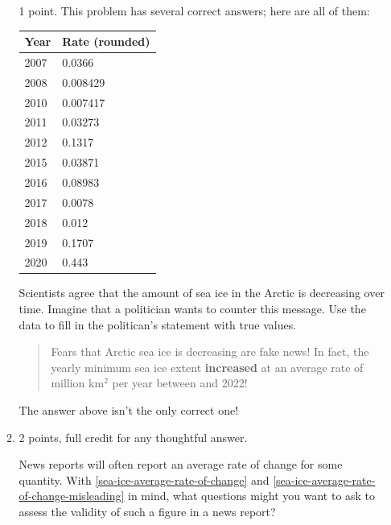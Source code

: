 \documentclass{article}
\begin{document}
\begin{enumerate}
\begin{enumerate}
    \begin{grading}
      1 point. This problem has several correct answers; here are all of them: 

      \begin{tabular}{l | l}
        Year & Rate (rounded) \\
        \hline 
        2007 & 0.0366 \\
        2008 & 0.008429 \\
        2010 & 0.007417 \\
        2011 & 0.03273 \\
        2012 & 0.1317 \\
        2015 & 0.03871 \\
        2016 & 0.08983 \\
        2017 & 0.0078 \\
        2018 & 0.012 \\
        2019 & 0.1707 \\
        2020 & 0.443
      \end{tabular}
    \end{grading}

    \begin{problem}[\vfill]
      Scientists agree that the amount of sea ice in the Arctic is decreasing over time. Imagine that a politician wants to counter this message. Use the data to fill in the politican's statement with true values.

      \begin{quote}
        Fears that Arctic sea ice is decreasing are fake news! In fact, the yearly minimum sea ice extent \textbf{increased} at an average rate of  million km$^2$ per year between  and 2022!
      \end{quote}
    \end{problem}

    \begin{solution}
      The answer above isn't the only correct one!
    \end{solution}

  \item

    \begin{grading}
      2 points, full credit for any thoughtful answer.
    \end{grading}

    \begin{problem}[\vfill\newpage]
      News reports will often report an average rate of change for some quantity. With \ref{sea-ice-average-rate-of-change} and \ref{sea-ice-average-rate-of-change-misleading} in mind, what questions might you want to ask to assess the validity of such a figure in a news report?
    \end{problem}


\end{enumerate}
\end{enumerate}
\end{document}
